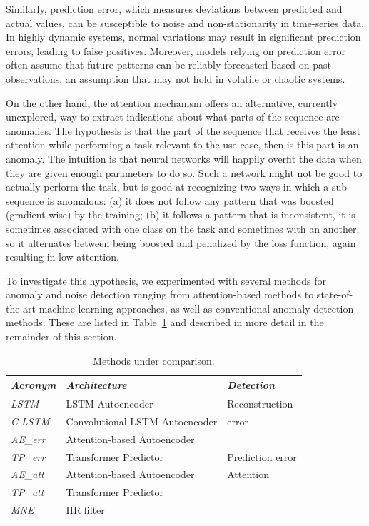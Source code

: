\documentclass[runningheads]{llncs}
\begin{document}
Similarly, prediction error, which measures deviations between
predicted and actual values, can be susceptible to noise and
non-stationarity in time-series data. In highly dynamic systems,
normal variations may result in significant prediction errors, leading
to false positives. Moreover, models relying on prediction error often
assume that future patterns can be reliably forecasted based on past
observations, an assumption that may not hold in volatile or chaotic
systems.

On the other hand, the attention mechanism offers an alternative,
currently unexplored, way to extract indications about what parts of
the sequence are anomalies. The hypothesis is that the part of the
sequence that receives the least attention while performing a task
relevant to the use case, then is this part is an anomaly. The
intuition is that neural networks will happily overfit the data
when they are given enough parameters to do so. Such a network might
not be good to actually perform the task, but is good at recognizing
two ways in which a sub-sequence is anomalous: (a) it does not follow
any pattern that was boosted (gradient-wise) by the training;
(b) it follows a pattern that is inconsistent, it is sometimes
associated with one class on the task and sometimes with an another,
so it alternates between being boosted and penalized by the loss
function, again resulting in low attention.

To investigate this hypothesis, we experimented with several methods
for anomaly and noise detection ranging from attention-based methods
to state-of-the-art machine learning approaches, as well as
conventional anomaly detection methods. These are listed in
Table~\ref{tab1} and described in more detail in the remainder of this
section.


\begin{table}[bt]
\centering
\caption{Methods under comparison.}
\label{tab1}
\begin{tabular}{lp{4cm}p{2cm}}
\toprule
\emph{Acronym}   & \emph{Architecture}& \emph{Detection}  \\
\midrule
\textit{LSTM}    & LSTM Autoencoder   & Reconstruction  \\
\textit{C-LSTM}  & Convolutional LSTM Autoencoder
                                      & error  \\
\textit{AE\_err} & Attention-based Autoencoder
                                      &   \\
\midrule
\textit{TP\_err} & Transformer Predictor
                                      & Prediction error  \\
\midrule
\textit{AE\_att} & Attention-based Autoencoder
                                      & Attention \\
\textit{TP\_att} & Transformer Predictor &  \\
\midrule
\textit{MNE}     & \multicolumn{2}{l}{IIR filter} \\
\bottomrule
\end{tabular} 
\end{table}
\end{document}
